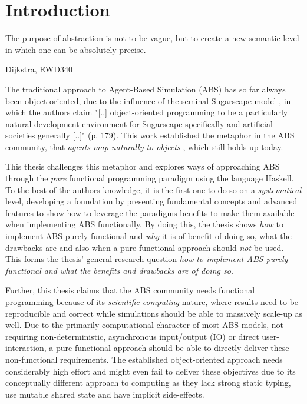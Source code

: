\chapter{Introduction}
\epigraph{The purpose of abstraction is not to be vague, but to create a new semantic level in which one can be absolutely precise.}{Dijkstra, EWD340}
\label{ch:intro}

The traditional approach to Agent-Based Simulation (ABS) has so far always been object-oriented, due to the influence of the seminal Sugarscape model \cite{epstein_growing_1996}, in which the authors claim "[..] object-oriented programming to be a particularly natural development environment for Sugarscape specifically and artificial societies generally [..]" (p. 179). This work established the metaphor in the ABS community, that \textit{agents map naturally to objects} \cite{north_managing_2007}, which still holds up today. %

This thesis challenges this metaphor and explores ways of approaching ABS through the \textit{pure} functional programming paradigm using the language Haskell. To the best of the authors knowledge, it is the first one to do so on a \textit{systematical} level, developing a foundation by presenting fundamental concepts and advanced features to show how to leverage the paradigms benefits \cite{hudak_history_2007} to make them available when implementing ABS functionally. By doing this, the thesis shows \textit{how} to implement ABS purely functional and \textit{why} it is of benefit of doing so, what the drawbacks are and also when a pure functional approach should \textit{not} be used. This forms the thesis' general research question \textit{how to implement ABS purely functional and what the benefits and drawbacks are of doing so.} 

Further, this thesis claims that the ABS community needs functional programming because of its \textit{scientific computing} nature, where results need to be reproducible and correct while simulations should be able to massively scale-up as well. Due to the primarily computational character of most ABS models, not requiring non-deterministic, asynchronous input/output (IO) or direct user-interaction, a pure functional approach should be able to directly deliver these non-functional requirements. The established object-oriented approach needs considerably high effort and might even fail to deliver these objectives due to its conceptually different approach to computing as they lack strong static typing, use mutable shared state and have implicit side-effects. 

